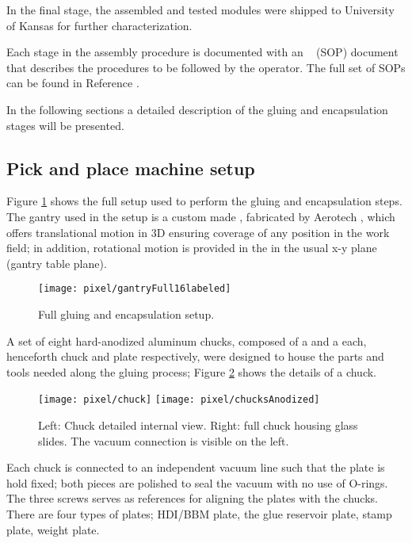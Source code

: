 In the final stage, the assembled and tested modules were shipped to University of Kansas for further characterization.  

Each stage in the assembly procedure is documented with an ~ (SOP) document that describes the procedures to be followed by the operator. The full set of SOPs can be found in Reference \cite{unl_sop}.     

In the following sections a detailed description of the gluing and encapsulation stages will be presented. 

\subsection{Pick and place machine setup}

Figure \ref{fig:setup} shows the full setup used to perform the gluing and encapsulation steps. The gantry used in the setup is a custom made , fabricated by Aerotech \cite{aerotech}, which offers translational motion in 3D ensuring coverage of any position in the work field; in addition, rotational motion is provided in the  in the usual x-y plane (gantry table plane).

\begin{figure}[!h]
  \centering
  \texttt{[image: pixel/gantryFull16labeled]}
  \caption[Full gluing and encapsulation setup]{Full gluing and encapsulation setup. }\label{fig:setup}
\end{figure}

A set of eight hard-anodized aluminum chucks, composed of a  and a  each, henceforth chuck and plate respectively, were designed to house the parts and tools needed along the gluing process; Figure \ref{fig:chuck} shows the details of a chuck.      

\begin{figure}[!h]
  \centering
  \texttt{[image: pixel/chuck]}
  \texttt{[image: pixel/chucksAnodized]}
  \caption[Bare and full chucks]{Left: Chuck detailed internal view. Right: full chuck housing glass slides. The vacuum connection is visible on the left.}\label{fig:chuck}
\end{figure}

Each chuck is connected to an independent vacuum line such that the plate is hold fixed; both pieces are polished to seal the vacuum with no use of O-rings. The three screws serves as references for aligning the plates with the chucks. There are four types of plates; HDI/BBM plate, the glue reservoir plate, stamp plate, weight plate.

